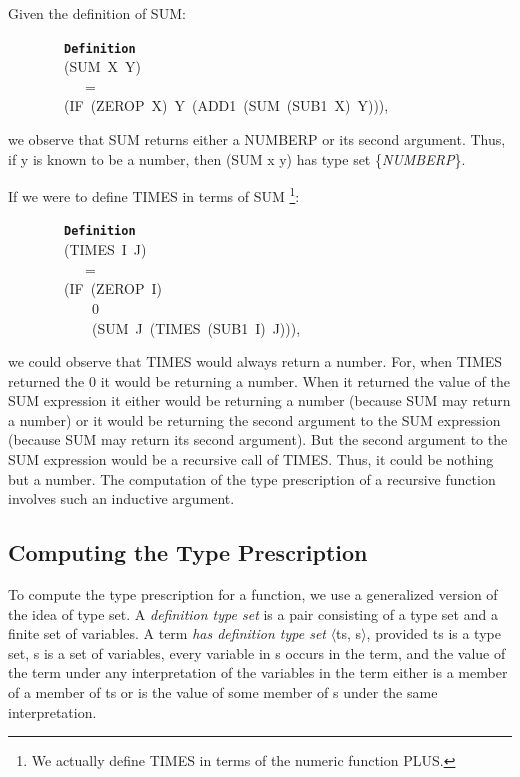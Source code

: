 \documentclass[11pt]{book}
\newenvironment{pubasis}{\begin{flushleft}\ttfamily\small}{\normalsize\rmfamily\end{flushleft}}
\newcommand{\axiomordefinition}[1]{\vspace{6pt}\texttt{\textbf{#1}}}
\newcommand{\pubinlineunderline}[1]{\emph{#1}}
\newcommand{\pubdefaulttextsize}{\large}
\begin{document}
Given the definition of SUM:
\begin{pubasis}
~~~~~~~~\axiomordefinition{Definition}\\
~~~~~~~~(SUM~X~Y)\\
~~~~~~~~~~~=\\
~~~~~~~~(IF~(ZEROP~X)~Y~(ADD1~(SUM~(SUB1~X)~Y))),\\
\end{pubasis}
we observe that SUM returns either a NUMBERP or its second
argument.  Thus, if y is known to be a number, then 
(SUM x y) has type set \{\pubinlineunderline{NUMBERP}\}.

If we were to define TIMES in terms of SUM \footnote{We actually define TIMES in terms of the numeric function PLUS.}:
\begin{pubasis}
~~~~~~~~\axiomordefinition{Definition}\\
~~~~~~~~(TIMES~I~J)\\
~~~~~~~~~~~=\\
~~~~~~~~(IF~(ZEROP~I)\\
~~~~~~~~~~~~0\\
~~~~~~~~~~~~(SUM~J~(TIMES~(SUB1~I)~J))),\\
\end{pubasis}
we could observe that TIMES would always return a number.
For, when TIMES returned the 0 it would be returning
a number.  When it returned the value of the SUM expression it either
would be returning a number (because SUM may return a number) or it
would be returning
the second argument to the SUM expression (because SUM  may
return its second argument).  But the second argument to the SUM
expression would be a recursive call of TIMES.  Thus, it could be nothing but
a number.  The computation of the type prescription of a recursive function
involves such an inductive argument.
\subsection{Computing the Type Prescription}
\pubdefaulttextsize
To compute the type prescription for a function, we use
a generalized version of the idea of type set.  A \pubinlineunderline{definition
type set} is a pair consisting of a type set and a
finite set of variables.   A term
\pubinlineunderline{has  definition type set} $\langle$ts, s$\rangle$, provided ts is a
type set, s is a set of variables, every variable in s
occurs in the term, and  the value of the term
under any interpretation of the variables in the term either
is a member of a member of ts or is the value of some
member of s under the same interpretation.
\end{document}
